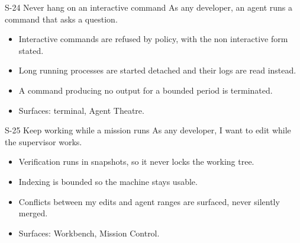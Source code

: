 \begin{story}{S-24 \quad Never hang on an interactive command}
As any developer, an agent runs a command that asks a question.
\end{story}
\begin{itemize}
  \item Interactive commands are refused by policy, with the non interactive form stated.
  \item Long running processes are started detached and their logs are read instead.
  \item A command producing no output for a bounded period is terminated.
  \item Surfaces: terminal, Agent Theatre.
\end{itemize}

\begin{story}{S-25 \quad Keep working while a mission runs}
As any developer, I want to edit while the supervisor works.
\end{story}
\begin{itemize}
  \item Verification runs in snapshots, so it never locks the working tree.
  \item Indexing is bounded so the machine stays usable.
  \item Conflicts between my edits and agent ranges are surfaced, never silently merged.
  \item Surfaces: Workbench, Mission Control.
\end{itemize}
